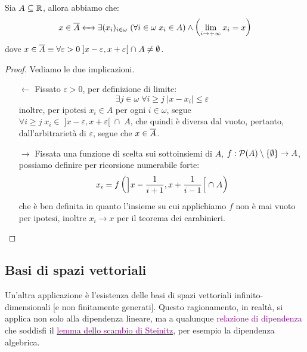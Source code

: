 \begin{proposition}
	Sia $A \subseteq \mathbb R$, allora abbiamo che:
	\[ x \in \overline A \leftarrow\mathrel{\mkern-7mu}\rightarrow \exists (x_i)_{i \in \omega} \; (\forall i \in \omega \; x_i \in A) \land \left(\lim_{i \to +\infty} x_i = x\right)
		\]
	dove $x \in \overline A \equiv \forall \varepsilon > 0 \; ]x - \varepsilon, x + \varepsilon[ \; \cap\; A \ne \emptyset$.
\end{proposition}

\begin{proof}
	Vediamo le due implicazioni.
	\begin{itemize}
		\item[$\boxed{\leftarrow}$] Fissato $\varepsilon > 0$, per definizione di limite:
		\[ \exists j \in \omega \; \forall i \geq j \; |x  - x_i| \leq \varepsilon
			\]
		inoltre, per ipotesi $x_i \in A$ per ogni $i \in \omega$, segue $\forall i \geq j \; x_i \in\; ]x - \varepsilon, x + \varepsilon[ \; \cap\; A$, che quindi è diversa dal vuoto, pertanto, dall'arbitrarietà di $\varepsilon$, segue che $x \in \overline A$.
		\item[$\boxed{\rightarrow}$] Fissata una funzione di scelta sui sottoinsiemi di $A$, $f : \mathcal{P}(A) \setminus\{\emptyset\} \to A$, possiamo definire per ricorsione numerabile forte:
		\[ x_i = f\left(\Bigr]x - \frac{1}{i+1}, x + \frac{1}{i-1}\Bigl[ \; \cap \; A\right)
			\]
		che è ben definita in quanto l'insieme su cui applichiamo $f$ non è mai vuoto per ipotesi, inoltre $x_i \to x$ per il teorema dei carabinieri.
	\end{itemize}
\end{proof}

\subsection{Basi di spazi vettoriali}

Un'altra applicazione è l'esistenza delle basi di spazi vettoriali infinito-dimensionali [e non finitamente generati]. Questo ragionamento, in realtà, si applica non solo alla dipendenza lineare, ma a qualunque \textcolor{purple}{relazione di dipendenza}
che soddisfi il \href{https://en.wikipedia.org/wiki/Steinitz_exchange_lemma}{\textcolor{purple}{lemma dello scambio di Steinitz}}, per esempio la dipendenza algebrica.

